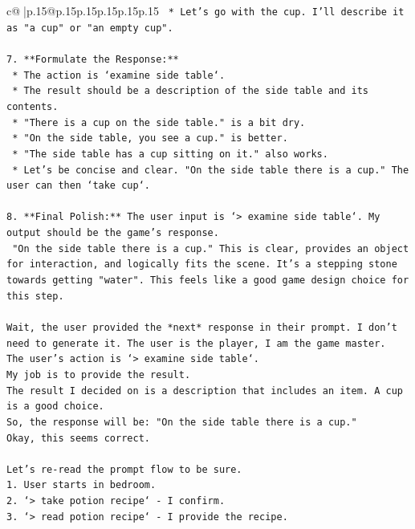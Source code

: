 \documentclass{article}
\begin{document}
{\begin{supertabular}{c@{$\;$}|p{.15\linewidth}@{}p{.15\linewidth}p{.15\linewidth}p{.15\linewidth}p{.15\linewidth}p{.15\linewidth}}
{{{\texttt{    *   Let's go with the cup. I'll describe it as "a cup" or "an empty cup".} \\
\\ 
\texttt{7.  **Formulate the Response:**} \\
\texttt{    *   The action is `examine side table`.} \\
\texttt{    *   The result should be a description of the side table and its contents.} \\
\texttt{    *   "There is a cup on the side table." is a bit dry.} \\
\texttt{    *   "On the side table, you see a cup." is better.} \\
\texttt{    *   "The side table has a cup sitting on it." also works.} \\
\texttt{    *   Let's be concise and clear. "On the side table there is a cup." The user can then `take cup`.} \\
\\ 
\texttt{8.  **Final Polish:** The user input is `> examine side table`. My output should be the game's response.} \\
\texttt{    "On the side table there is a cup." This is clear, provides an object for interaction, and logically fits the scene. It's a stepping stone towards getting "water". This feels like a good game design choice for this step.} \\
\\ 
\texttt{Wait, the user provided the *next* response in their prompt. I don't need to generate it. The user is the player, I am the game master.} \\
\texttt{The user's action is `> examine side table`.} \\
\texttt{My job is to provide the result.} \\
\texttt{The result I decided on is a description that includes an item. A cup is a good choice.} \\
\texttt{So, the response will be: "On the side table there is a cup."} \\
\texttt{Okay, this seems correct.} \\
\\ 
\texttt{Let's re{-}read the prompt flow to be sure.} \\
\texttt{1. User starts in bedroom.} \\
\texttt{2. `> take potion recipe` {-} I confirm.} \\
\texttt{3. `> read potion recipe` {-} I provide the recipe.} \\
}}}
\end{supertabular}}
\end{document}
